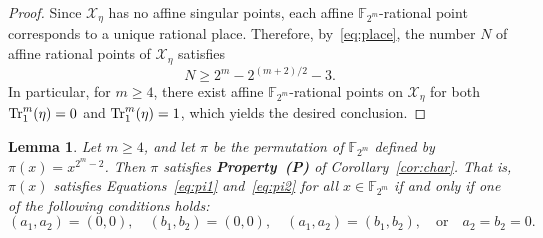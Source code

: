 \documentclass[12pt]{article}
\theoremstyle{plain}
\newtheorem{lemma}{Lemma}
\theoremstyle{definition}
\newcommand{\Tr}{{\rm Tr}}
\begin{document}
\begin{proof}
		\medskip
		Since \(\mathcal{X}_\eta\) has no affine singular points, each affine
		\(\mathbb{F}_{2^m}\)-rational point corresponds to a unique rational place.
		Therefore, by~\eqref{eq:place}, the number \(N\) of affine rational points of
		\(\mathcal{X}_\eta\) satisfies
		\[
		N \geq 2^m-2^{(m+2)/2}-3.
		\]
		In particular, for \(m\geq 4\), there exist affine
		\(\mathbb{F}_{2^m}\)-rational points on \(\mathcal{X}_\eta\) for both
		\(\Tr_{1}^{m}(\eta)=0\) and \(\Tr_{1}^{m}(\eta)=1\),
		which yields the desired conclusion.
	\end{proof}
	
	\begin{lemma}\label{pro:pi}
		Let \(m \ge 4\), and let \(\pi\) be the permutation of \(\mathbb{F}_{2^m}\)
		defined by \(\pi(x) = x^{2^m-2}\). Then $\pi$ satisfies \textbf{Property~(P)}
		of Corollary~\ref{cor:char}. That is, $\pi(x)$
		satisfies Equations~\eqref{eq:pi1}
		and~\eqref{eq:pi2} for all $x\in\mathbb{F}_{2^m}$ if and only if one of the
		following conditions holds:
		\[
		(a_1,a_2)=(0,0), \quad (b_1,b_2)=(0,0), \quad (a_1,a_2)=(b_1,b_2),
		\quad \text{or} \quad a_2=b_2=0.
		\]
	\end{lemma}
	
\end{document}
